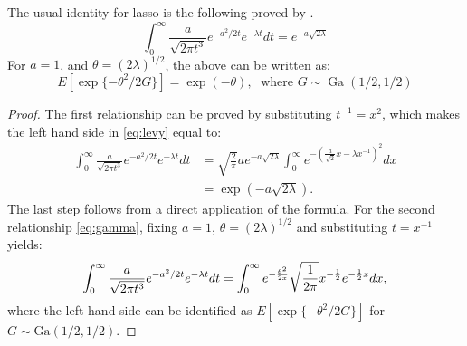 \documentclass[letterpaper,11pt]{article}
\begin{document}
\begin{remark}
The usual identity for lasso is the following proved by \citet{levy1940certains}.
\begin{equation}
  \int_{0}^{\infty} \frac{a}{\sqrt{2\pi t^3}} e^{-a^2/2t} e^{-\lambda t} dt = e^{-a\sqrt{2\lambda}} \label{eq:levy}
\end{equation}
For $a = 1$, and $\theta = (2\lambda)^{1/2}$, the above can be written as: 
\begin{equation}
  E \left[\exp\{-\theta^2/2 G \} \right] = \exp(-\theta), \; \text{ where } G \sim \operatorname{Ga} (1/2, 1/2) \label{eq:gamma}
\end{equation}
\end{remark}
\begin{proof}
The first relationship can be proved by substituting $t^{-1} = x^2$, which makes the left hand side in \eqref{eq:levy} equal to: 
\begin{align*}
\int_{0}^{\infty} \frac{a}{\sqrt{2\pi t^3}} e^{-a^2/2t} e^{-\lambda t} dt & = \sqrt{\frac{2}{\pi}} a e^{-a\sqrt{2\lambda}} \int_0^{\infty} e^{-\left(\frac{a}{\sqrt{2}} x - \lambda x^{-1}\right)^2} dx \\
& = \exp(-a\sqrt{2\lambda}).
\end{align*}
The last step follows from a direct application of the \CS formula. For the second relationship \eqref{eq:gamma}, fixing $a = 1$, $\theta = (2\lambda)^{1/2}$ and substituting $t = x^{-1}$ yields: 
$$
\int_{0}^{\infty} \frac{a}{\sqrt{2\pi t^3}} e^{-a^2/2t} e^{-\lambda t} dt = \int_{0}^{\infty} e^{-\frac{\theta^2}{2x}} \sqrt{\frac{1}{2\pi}} x^{-\frac{1}{2}} e^{-\frac{1}{2} x} dx, 
$$
where the left hand side can be identified as $E \left[\exp\{-\theta^2/2 G \} \right]$ for $G \sim \mbox{Ga}(1/2,1/2)$. \qedhere
\end{proof}
\end{document}
